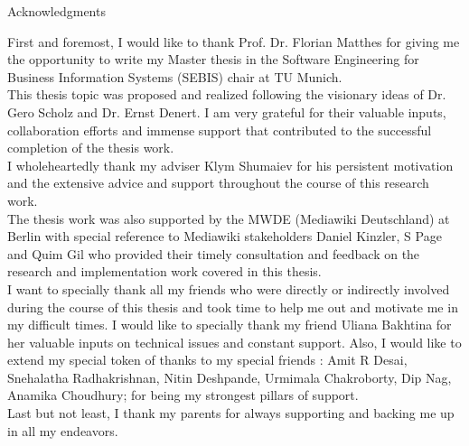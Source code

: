 \thispagestyle{empty}

\vspace*{2cm}

\begin{center}
{ Acknowledgments}
\end{center}

\vspace{1cm}

First and foremost, I would like to thank Prof. Dr. Florian Matthes for giving me the opportunity to write my Master thesis in the Software Engineering for Business Information Systems (SEBIS) chair at TU Munich. 
\\\indent This thesis topic was proposed and realized following the visionary ideas of Dr. Gero Scholz and Dr. Ernst Denert. I am very grateful for their valuable inputs, collaboration efforts and immense support that contributed to the successful completion of the thesis work. 
\\\indent I wholeheartedly thank my adviser Klym Shumaiev for his persistent motivation and the extensive advice and support throughout the course of this research work. 
\\\indent The thesis work was also supported by the MWDE (Mediawiki Deutschland) at Berlin with special reference to Mediawiki stakeholders Daniel Kinzler, S Page and Quim Gil who provided their timely consultation and feedback on the research and implementation work covered in this thesis.
\\\indent I want to specially thank all my friends who were directly or indirectly involved during the course of this thesis and took time to help me out and motivate me in my difficult times. I would like to specially thank my friend Uliana Bakhtina for her valuable inputs on technical issues and constant support. Also, I would like to extend my special token of thanks to my special friends : Amit R Desai, Snehalatha Radhakrishnan, Nitin Deshpande, Urmimala Chakroborty, Dip Nag, Anamika Choudhury; for being my strongest pillars of support.
\\\indent Last but not least, I thank my parents for always supporting and backing me up in all my endeavors.



\cleardoublepage{}
